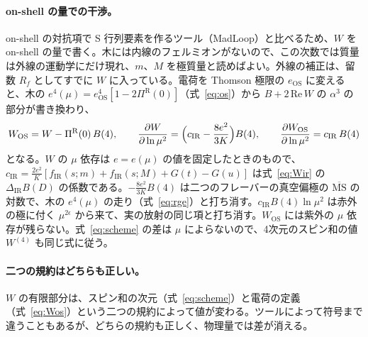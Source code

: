 \documentclass[a4paper,10pt]{ltjsarticle}
\newcommand{\MSbar}{\overline{\mathrm{MS}}}
\newcommand{\DIR}{\Delta_{\mathrm{IR}}}
\begin{document}
\paragraph{on-shell の量での干渉。}on-shell の対抗項で S 行列要素を作るツール（MadLoop）と比べるため、$W$ を on-shell の量で書く。木には内線のフェルミオンがないので、この次数では質量は外線の運動学にだけ現れ、$m$、$M$ を極質量と読めばよい。外線の補正は、留数 $R_f$ としてすでに $W$ に入っている。電荷を Thomson 極限の $e_{\mathrm{OS}}$ に変えると、木の $e^4(\mu)=e_{\mathrm{OS}}^4[1-2\Pi^{\mathrm R}(0)]$（式~\eqref{eq:os}）から $B+2\,\mathrm{Re}\,W$ の $\alpha^3$ の部分が書き換わり、
\begin{equation}
W_{\mathrm{OS}}=W-\Pi^{\mathrm R}(0)\,B(4),\qquad
\frac{\partial W}{\partial\ln\mu^2}=\Bigl(c_{\mathrm{IR}}-\frac{8e^2}{3K}\Bigr)B(4),\qquad
\frac{\partial W_{\mathrm{OS}}}{\partial\ln\mu^2}=c_{\mathrm{IR}}\,B(4)
\label{eq:Wos}
\end{equation}
となる。$W$ の $\mu$ 依存は $e=e(\mu)$ の値を固定したときのもので、$c_{\mathrm{IR}}=\frac{2e^2}{K}[f_{\mathrm{IR}}(s;m)+f_{\mathrm{IR}}(s;M)+G(t)-G(u)]$ は式~\eqref{eq:Wir} の $\DIR B(D)$ の係数である。$-\frac{8e^2}{3K}B(4)$ は二つのフレーバーの真空偏極の $\MSbar$ の対数で、木の $e^4(\mu)$ の走り（式~\eqref{eq:rge}）と打ち消す。$c_{\mathrm{IR}}B(4)\ln\mu^2$ は赤外の極に付く $\mu^{2\epsilon}$ から来て、実の放射の同じ項と打ち消す。$W_{\mathrm{OS}}$ には紫外の $\mu$ 依存が残らない。式~\eqref{eq:scheme} の差は $\mu$ によらないので、4次元のスピン和の値 $W^{(4)}$ も同じ式に従う。

\paragraph{二つの規約はどちらも正しい。}$W$ の有限部分は、スピン和の次元（式~\eqref{eq:scheme}）と電荷の定義（式~\eqref{eq:Wos}）という二つの規約によって値が変わる。ツールによって符号まで違うこともあるが、どちらの規約も正しく、物理量では差が消える。
\end{document}
